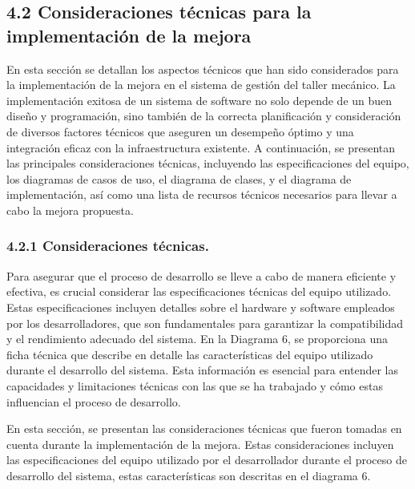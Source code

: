 \subsection{4.2 Consideraciones técnicas para la implementación de la mejora}
En esta sección se detallan los aspectos técnicos que han sido considerados para la implementación de la mejora en el sistema de gestión del taller mecánico. La implementación exitosa de un sistema de software no solo depende de un buen diseño y programación, sino también de la correcta planificación y consideración de diversos factores técnicos que aseguren un desempeño óptimo y una integración eficaz con la infraestructura existente. A continuación, se presentan las principales consideraciones técnicas, incluyendo las especificaciones del equipo, los diagramas de casos de uso, el diagrama de clases, y el diagrama de implementación, así como una lista de recursos técnicos necesarios para llevar a cabo la mejora propuesta.


\subsubsection*{4.2.1 Consideraciones técnicas.}
Para asegurar que el proceso de desarrollo se lleve a cabo de manera eficiente y efectiva, es crucial considerar las especificaciones técnicas del equipo utilizado. Estas especificaciones incluyen detalles sobre el hardware y software empleados por los desarrolladores, que son fundamentales para garantizar la compatibilidad y el rendimiento adecuado del sistema. En la Diagrama 6, se proporciona una ficha técnica que describe en detalle las características del equipo utilizado durante el desarrollo del sistema. Esta información es esencial para entender las capacidades y limitaciones técnicas con las que se ha trabajado y cómo estas influencian el proceso de desarrollo.

En esta sección, se presentan las consideraciones técnicas que fueron tomadas en cuenta durante la implementación de la mejora. Estas consideraciones incluyen las especificaciones del equipo utilizado por el desarrollador durante el proceso de desarrollo del sistema, estas características son descritas en el diagrama 6.

